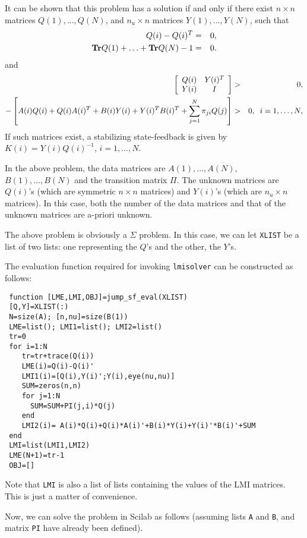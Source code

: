 It can be shown that this problem has a solution if and only if
there exist $n \times n$ matrices  $Q(1),\ldots,Q(N)$, and $n_u \times n$
matrices $Y(1),\ldots,Y(N)$, such that  
\begin{eqnarray*}
Q(i)- Q(i)^T&=& 0 , \\
{\mathop{\bf Tr}} Q(1)+ \ldots +{\mathop{\bf Tr}} Q(N) -1 &=& 0.
\end{eqnarray*}
and
\begin{eqnarray*}
\left[ \begin{array}{cc} Q(i) & Y(i)^T \\ Y(i) & I \end{array}\right] &>&0, \\
- \left[ A(i)Q(i)+Q(i)A(i)^{T} + B(i)Y(i)+Y(i)^TB(i)^{T}+
\displaystyle\sum_{j=1}^{N}\pi_{ji}Q(j) \right] &>& 0, \;\; i = 1,\ldots,N, \\
\end{eqnarray*}
If such matrices exist, a stabilizing
state-feedback is given by $K(i) = Y(i)Q(i)^{-1}$, $i=1,\ldots,N$.

In the above problem, the data matrices are $A(1),\ldots,A(N)$,
$B(1),\ldots,B(N)$ and the transition matrix $\Pi$.  The unknown 
matrices are $Q(i)$'s (which are symmetric $n \times n$ matrices) and
$Y(i)$'s (which are $n_u \times n$ matrices). In this case, both
the number of the data matrices and that of the unknown matrices
are a-priori unknown. 

The above problem is obviously a $\Sigma$ problem.  In this case,
we can let {\tt XLIST} be a list of two lists: one representing
the $Q$'s and the other, the $Y$'s.

The evaluation function required for invoking {\tt lmisolver} can be constructed as
follows:
\begin{verbatim}
 function [LME,LMI,OBJ]=jump_sf_eval(XLIST)
 [Q,Y]=XLIST(:)
 N=size(A); [n,nu]=size(B(1))
 LME=list(); LMI1=list(); LMI2=list()
 tr=0
 for i=1:N
    tr=tr+trace(Q(i))
    LME(i)=Q(i)-Q(i)'
    LMI1(i)=[Q(i),Y(i)';Y(i),eye(nu,nu)]
    SUM=zeros(n,n)
    for j=1:N
      SUM=SUM+PI(j,i)*Q(j)
    end
    LMI2(i)= A(i)*Q(i)+Q(i)*A(i)'+B(i)*Y(i)+Y(i)'*B(i)'+SUM
 end
 LMI=list(LMI1,LMI2)
 LME(N+1)=tr-1
 OBJ=[]
\end{verbatim}
Note that {\tt LMI} is also a list of lists containing the values
of the LMI matrices. This is just a matter of convenience.

Now, we can solve the problem in
Scilab as follows (assuming lists {\tt A} and {\tt B}, and  matrix
{\tt PI} have already been defined).

